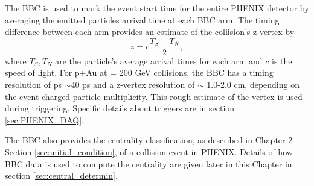 The BBC is used to mark the event start time for the entire PHENIX detector by averaging the emitted particles arrival time at each BBC arm. The timing difference between each arm provides an estimate of the collision's z-vertex by
\begin{equation}
z = c \frac{T_S - T_N}{2},
\end{equation}
where $T_S, T_N$ are the particle's average arrival times for each arm and $c$ is the speed of light.%
For p+Au at \sqsn = 200 GeV collisions, the BBC has a timing resolution of ps $\sim$40 ps and a z-vertex resolution of $\sim$ 1.0-2.0 cm, depending on the event charged particle multiplicity. This rough estimate of the vertex is used during triggering. Specific details about triggers are in section \ref{sec:PHENIX_DAQ}.

The BBC also provides the centrality classification, as described in Chapter 2 Section \ref{sec:initial_condition}, of a collision event in PHENIX. Details of how BBC data is used to compute the centrality are given later in this Chapter in section \ref{sec:central_determin}.


